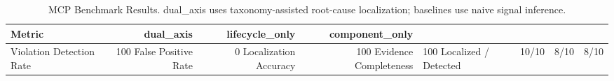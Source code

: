 \begin{table}[h]
\centering
\begin{tabular}{lrrr}
\hline
Metric & dual\_axis & lifecycle\_only & component\_only \\
\hline
Violation Detection Rate & 100%
False Positive Rate & 0%
Localization Accuracy & 100%
Evidence Completeness & 100%
Localized / Detected & 10/10 & 8/10 & 8/10 \\
\hline
\end{tabular}
\caption{MCP Benchmark Results. dual\_axis uses taxonomy-assisted root-cause localization; baselines use naive signal inference.}
\label{tab:benchmark}
\end{table}